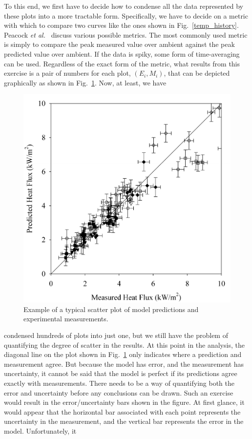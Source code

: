 To this end, we first have to decide how to condense all the data represented by these plots into a more tractable form. Specifically, we
have to decide on a metric with which to compare two curves like the ones shown in Fig.~\ref{temp_history}. Peacock {\em et al.}~\cite{Peacock:FSJ1999} discuss various possible metrics. The most commonly used metric is simply to compare the peak measured value over ambient against the peak
predicted value over ambient. If the data is spiky, some form of time-averaging can be used. Regardless of the exact form of the metric, what results from
this exercise is a pair of numbers for each plot, $(E_i,M_i)$, that can be depicted graphically as shown in Fig.~\ref{scatterplot}. Now, at least, we have
\begin{figure}[ht]
\begin{center}
\includegraphics[height=3.in]{FIGURES/scatterplot}
\end{center}
\caption[Sample scatter plot.]{Example of a typical scatter plot of model predictions and experimental measurements.}
\label{scatterplot}
\end{figure}
condensed hundreds of plots into just one, but we still have the problem of quantifying the degree of scatter in the results. At this point in the analysis, the
diagonal line on the plot shown in Fig.~\ref{scatterplot} only indicates where a prediction and measurement agree. But because the model has error, and
the measurement has uncertainty, it cannot be said that the model is perfect if its predictions agree exactly with measurements. There needs to be a way of quantifying
both the error and uncertainty before any conclusions can be drawn.
Such an exercise would result in the error/uncertainty bars shown in the figure. At first glance, it would appear that the
horizontal bar associated with each point represents the uncertainty in the measurement, and the vertical bar represents the error in the model. Unfortunately, it
